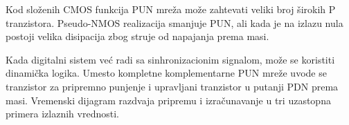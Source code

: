 Kod složenih CMOS funkcija PUN mreža može zahtevati veliki broj širokih P tranzistora. Pseudo-NMOS realizacija smanjuje PUN, ali kada je na izlazu nula postoji velika disipacija zbog struje od napajanja prema masi.

Kada digitalni sistem već radi sa sinhronizacionim signalom, može se koristiti dinamička logika. Umesto kompletne komplementarne PUN mreže uvode se tranzistor za pripremno punjenje i upravljani tranzistor u putanji PDN prema masi. Vremenski dijagram razdvaja pripremu i izračunavanje u tri uzastopna primera izlaznih vrednosti.
